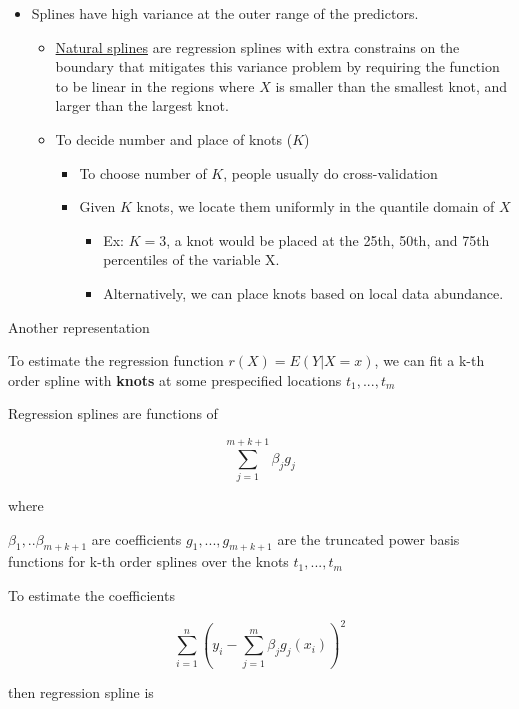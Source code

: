 \documentclass[
]{book}
\begin{document}
\begin{itemize}
\item
  Splines have high variance at the outer range of the predictors.

  \begin{itemize}
  \item
    \protect\hyperlink{natural-splines}{Natural splines} are regression splines with extra constrains on the boundary that mitigates this variance problem by requiring the function to be linear in the regions where \(X\) is smaller than the smallest knot, and larger than the largest knot.
  \item
    To decide number and place of knots (\(K\))

    \begin{itemize}
    \item
      To choose number of \(K\), people usually do cross-validation
    \item
      Given \(K\) knots, we locate them uniformly in the quantile domain of \(X\)

      \begin{itemize}
      \item
        Ex: \(K = 3\), a knot would be placed at the 25th, 50th, and 75th percentiles of the variable X.
      \item
        Alternatively, we can place knots based on local data abundance.
      \end{itemize}
    \end{itemize}
  \end{itemize}
\end{itemize}

Another representation

To estimate the regression function \(r(X) = E(Y|X =x)\), we can fit a k-th order spline with \textbf{knots} at some prespecified locations \(t_1,...,t_m\)

Regression splines are functions of

\[
\sum_{j=1}^{m+k+1} \beta_jg_j
\]

where

\(\beta_1,..\beta_{m+k+1}\) are coefficients \(g_1,...,g_{m+k+1}\) are the truncated power basis functions for k-th order splines over the knots \(t_1,...,t_m\)

To estimate the coefficients

\[
\sum_{i=1}^{n} (y_i - \sum_{j=1}^{m} \beta_j g_j (x_i))^2
\]

then regression spline is
\end{document}
